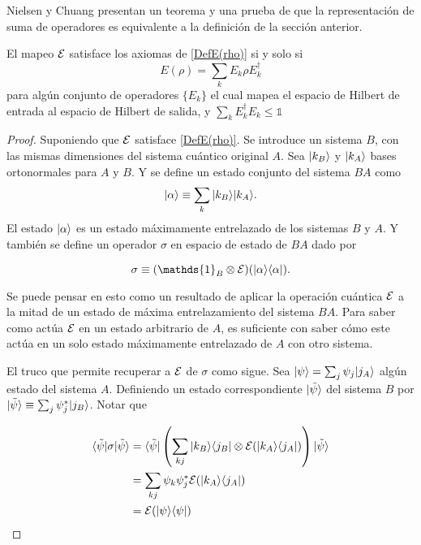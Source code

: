 Nielsen y Chuang {\cite{nielsen_chuang_2010}} presentan un teorema y una prueba de que la representación de suma de operadores es equivalente a la definición de la sección anterior.

\begin{theorem}
    El mapeo $\mathcal{E}$ satisface los axiomas de {\ref{DefE(rho)}} si y solo si 
    \begin{equation}
        E(\rho)=\sum_k E_k \rho E_k^\dagger
    \end{equation}
    para algún conjunto de operadores $\{E_k\}$ el cual mapea el espacio de Hilbert de entrada al espacio de Hilbert de salida, y $\sum_k E_k^\dagger E_k\le \mathds{1}$
\end{theorem}


\begin{proof}
Suponiendo que $\mathcal{E}$ satisface {\ref{DefE(rho)}}. Se introduce un sistema $B$, con las mismas dimensiones del sistema cuántico original $A$. Sea $|k_B\rangle$ y $|k_A\rangle$ bases ortonormales para $A$ y $B$. Y se define un estado conjunto del sistema $BA$ como \[|\alpha\rangle \equiv \sum_k |k_B\rangle |k_A\rangle. \] El estado $|\alpha\rangle $ es un estado máximamente entrelazado de los sistemas $B$ y $A$. Y también se define un operador $\sigma$ en espacio de estado de $BA$ dado por 

\begin{equation}\label{sigma1}
    \sigma \equiv (\mathds{1}_B\otimes\E)(|\alpha\rala \alpha|).
\end{equation}


Se puede pensar en esto como un resultado de aplicar la operación cuántica $\mathcal{E}$ a la mitad de un estado de máxima entrelazamiento del sistema $BA$. Para saber como actúa $\mathcal{E}$ en un estado arbitrario de $A$, es suficiente con saber cómo este actúa en un solo estado máximamente entrelazado de $A$ con otro sistema.

El truco que permite recuperar a $\mathcal{E}$ de $\sigma$ como sigue. Sea $|\psi\rangle=\sum_j \psi_j |j_A\rangle$ algún estado del sistema $A$. Definiendo un estado correspondiente $|\tilde{\psi}\rangle$ del sistema $B$ por $|\tilde{\psi}\rangle \equiv \sum_j \psi_j^*|j_B\rangle$. Notar que

\begin{equation}
    \begin{split}
        \langle \tilde \psi |\sigma |\tilde{\psi}\rangle&= \langle \tilde \psi |\left(\sum_{kj} |k_B\rangle \langle j_B|\otimes\mathcal{E} (|k_A \rangle \langle j_A|)\right) |\tilde{\psi}\rangle\\
        &=\sum_{kj} \psi_k \psi_j^* \mathcal{E} (|k_A \rangle \langle j_A|)\\
        &=\mathcal{E}(|\psi\rangle \langle\psi|)
    \end{split}
\end{equation}



\end{proof}
